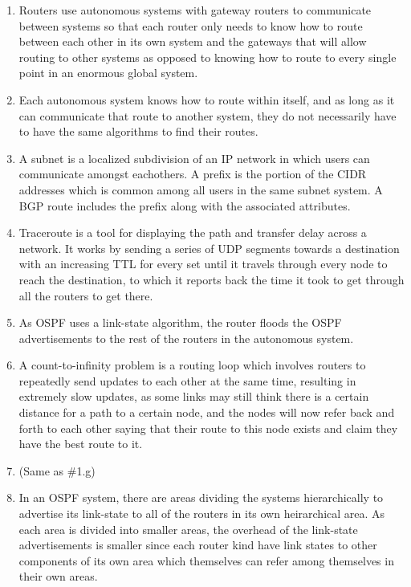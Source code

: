 \documentclass[12pt]{article}
\begin{document}
\begin{enumerate}
\begin{enumerate}
			\item Routers use autonomous systems with gateway routers to communicate between systems so that each router only needs to know how to route between each other in its own system and the gateways that will allow routing to other systems as opposed to knowing how to route to every single point in an enormous global system.
			\item Each autonomous system knows how to route within itself, and as long as it can communicate that route to another system, they do not necessarily have to have the same algorithms to find their routes.
			\item A subnet is a localized subdivision of an IP network in which users can communicate amongst eachothers. A prefix is the portion of the CIDR addresses which is common among all users in the same subnet system. A BGP route includes the prefix along with the associated attributes.
			\item Traceroute is a tool for displaying the path and transfer delay across a network. It works by sending a series of UDP segments towards a destination with an increasing TTL for every set until it travels through every node to reach the destination, to which it reports back the time it took to get through all the routers to get there.
			\item As OSPF uses a link-state algorithm, the router floods the OSPF advertisements to the rest of the routers in the autonomous system.
			\item A count-to-infinity problem is a routing loop which involves routers to repeatedly send updates to each other at the same time, resulting in extremely slow updates, as some links may still think there is a certain distance for a path to a certain node, and the nodes will now refer back and forth to each other saying that their route to this node exists and claim they have the best route to it.
			\item (Same as \#1.g)
			\item In an OSPF system, there are areas dividing the systems hierarchically to advertise its link-state to all of the routers in its own heirarchical area. As each area is divided into smaller areas, the overhead of the link-state advertisements is smaller since each router kind have link states to other components of its own area which themselves can refer among themselves in their own areas.

		\end{enumerate}


\end{enumerate}
\end{document}
